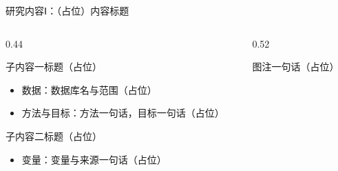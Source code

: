 \documentclass[aspectratio=169,11pt]{beamer}
\begin{document}
\begin{frame}{研究内容Ⅰ：（占位）内容标题}
  \footnotesize
  \begin{columns}[T]
    \begin{column}{0.44\textwidth}
      \begin{dmupoint}{子内容一标题（占位）}
        \begin{itemize}
          \item \textcolor{dmuhead}{数据}：数据库名与范围（占位）
          \item \textcolor{dmuhead}{方法与目标}：方法一句话，目标一句话（占位）
        \end{itemize}
      \end{dmupoint}
      \begin{dmupoint}{子内容二标题（占位）}
        \begin{itemize}
          \item \textcolor{dmuhead}{变量}：变量与来源一句话（占位）
        \end{itemize}
      \end{dmupoint}
    \end{column}
    \begin{column}{0.52\textwidth}
      \begin{center}

        \vskip0.8mm
        {\scriptsize\color{dmugray} 图注一句话（占位）}
      \end{center}
    \end{column}
  \end{columns}
\end{frame}
\end{document}
